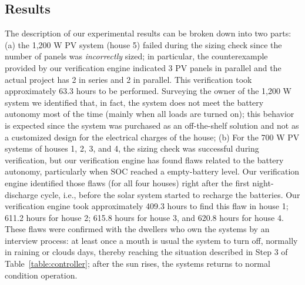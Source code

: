 \documentclass[journal]{IEEEtran}
\begin{document}
\subsection{Results}
\label{sec:results_indeed}
%
%
The description of our experimental results can be broken down into two parts: (a) the 1,200 W PV system (house 5) failed during the sizing check since the number of panels was \textit{incorrectly} sized; in particular, the counterexample provided by our verification engine indicated 3 PV panels in parallel and the actual project has 2 in series and 2 in parallel. This verification took approximately 63.3 hours to be performed. Surveying the owner of the 1,200 W system we identified that, in fact, the system does not meet the battery autonomy most of the time (mainly when all loads are turned on); this behavior is expected since the system was purchased as an off-the-shelf solution and not as a customized design for the electrical charges of the house; (b) For the 700 W PV systems of houses 1, 2, 3, and 4, the sizing check was successful during verification, but our verification engine has found flaws related to the battery autonomy, particularly when SOC reached a empty-battery level. Our verification engine identified those flaws (for all four houses) right after the first night-discharge cycle, i.e., before the solar system started to recharge the batteries. Our verification engine took approximately 409.3 hours to find this flaw in house 1; 611.2 hours for house 2; 615.8 hours for house 3, and 620.8 hours for house 4. These flaws were confirmed with the dwellers who own the systems by an interview process: at least once a mouth is usual the system to turn off, normally in raining or clouds days, thereby reaching the situation described in Step 3 of Table~\ref{table:controller}; after the sun rises, the systems returns to normal condition operation. 
\end{document}

